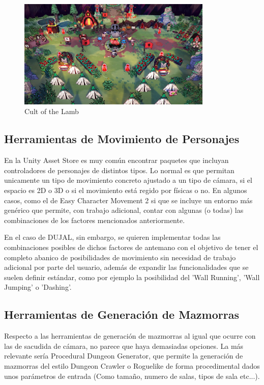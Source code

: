 \begin{figure}[H]
    \centering
    \includegraphics[width=350px,clip=true]{cult_of_the_lamb.png}
    \caption{Cult of the Lamb}
    \label{fig:clamb}
\end{figure}

\subsection{Herramientas de Movimiento de Personajes}
En la Unity Asset Store\cite{unityAssetStore} es muy común encontrar paquetes que incluyan controladores de personajes de distintos tipos. Lo normal es que permitan unicamente un tipo de movimiento concreto ajustado
 a un tipo de cámara, si el espacio es 2D o 3D o si el movimiento está regido por físicas o no. En algunos casos, como el de Easy Character Movement 2\cite{ECM2} si que se incluye un entorno más genérico que permite,
 con trabajo adicional, contar con algunas (o todas) las combinaciones de los factores mencionados anteriormente. 
 
 En el caso de DUJAL, sin embargo, se quieren implementar todas las combinaciones posibles de dichos 
 factores de antemano con el objetivo de tener el completo abanico de posibilidades de movimiento sin necesidad de trabajo adicional por parte del usuario, además de expandir las funcionalidades que se suelen 
 definir estándar, como por ejemplo la posibilidad del 'Wall Running'\cite{wallRun}, 'Wall Jumping'\cite{wallJump} o 'Dashing'\cite{dash}.

\subsection{Herramientas de Generación de Mazmorras}
Respecto a las herramientas de generación de mazmorras al igual que ocurre con las de sacudida de cámara, no parece que haya demasiadas opciones. La más relevante sería Procedural Dungeon 
Generator\cite{ProceduralDunGen}, que permite la generación de mazmorras del estilo Dungeon Crawler o Roguelike de forma procedimental dados unos parámetros de entrada (Como tamaño, numero de salas, tipos de sala etc...).

